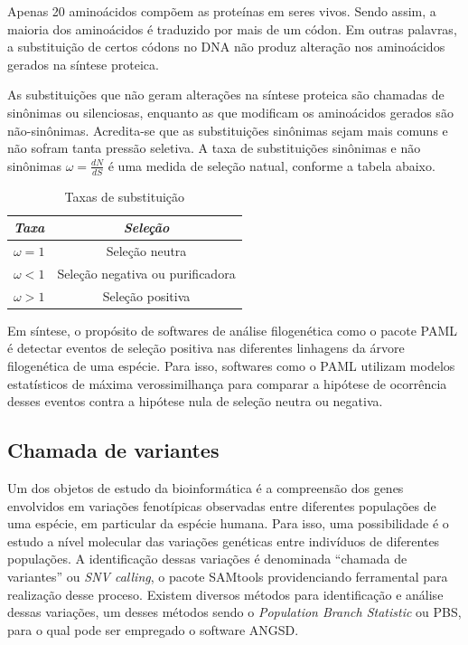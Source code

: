 \documentclass[cic,tc]{iiufrgs}
\begin{document}
Apenas 20 aminoácidos compõem as proteínas em seres vivos. Sendo assim, a
maioria dos aminoácidos é traduzido por mais de um códon. Em outras palavras, a
substituição de certos códons no DNA não produz alteração nos aminoácidos
gerados na síntese proteica.

As substituições que não geram alterações na síntese proteica são chamadas de
sinônimas ou silenciosas, enquanto as que modificam os aminoácidos gerados são
não-sinônimas. Acredita-se que as substituições sinônimas sejam mais comuns e
não sofram tanta pressão seletiva. A taxa de substituições sinônimas e não
sinônimas $\omega = \frac{dN}{dS}$ é uma medida de seleção natual, conforme a
tabela abaixo.\cite{yang2002codon}

\begin{table}[h]
    \caption{Taxas de substituição}
    \centering
        \begin{tabular}{c|c}
          \hline
          \textit{Taxa}  &   \textit{Seleção} \\
          \hline
          \hline
          $\omega = 1$ & Seleção neutra \\
          $\omega < 1$ & Seleção negativa ou purificadora \\
          $\omega > 1$ & Seleção positiva \\
          \hline
        \end{tabular}
    \label{tbl:ex1}
\end{table}

Em síntese, o propósito de softwares de análise filogenética como o pacote PAML
é detectar eventos de seleção positiva nas diferentes linhagens da árvore
filogenética de uma espécie. Para isso, softwares como o PAML utilizam modelos
estatísticos de máxima verossimilhança para comparar a hipótese de ocorrência
desses eventos contra a hipótese nula de seleção neutra ou
negativa.\cite{moretti2012gcodeml}

\subsection{Chamada de variantes}
\label{sec:call}

Um dos objetos de estudo da bioinformática é a compreensão dos genes envolvidos
em variações fenotípicas observadas entre diferentes populações de uma
espécie, em particular da espécie humana.\cite{jiang2019population} Para isso,
uma possibilidade é o estudo a nível molecular das variações genéticas entre
indivíduos de diferentes populações. A identificação dessas variações é
denominada ``chamada de variantes'' ou \textit{SNV calling}, o pacote SAMtools
providenciando ferramental para realização desse
proceso.\cite{pirooznia2014validation} Existem diversos métodos para
identificação e análise dessas variações, um desses métodos sendo o
\textit{Population Branch Statistic} ou PBS,\cite{jiang2019population} para o
qual pode ser empregado o software ANGSD.
\end{document}
